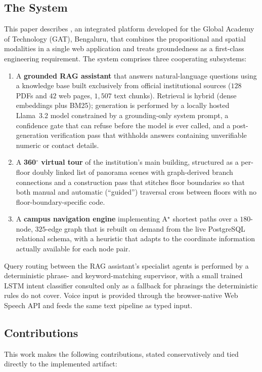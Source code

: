 \subsection{The \system{} System}
This paper describes \system{}, an integrated platform developed for the
Global Academy of Technology (GAT), Bengaluru, that combines the
propositional and spatial modalities in a single web application and treats
groundedness as a first-class engineering requirement. The system comprises
three cooperating subsystems:

\begin{enumerate}
\item A \textbf{grounded RAG assistant} that answers natural-language
questions using a knowledge base built exclusively from official
institutional sources ($128$ PDFs and $42$ web pages, $1{,}507$ text
chunks). Retrieval is hybrid (dense embeddings plus BM25); generation is
performed by a locally hosted Llama~3.2 model constrained by a
grounding-only system prompt, a confidence gate that can refuse before the
model is ever called, and a post-generation verification pass that
withholds answers containing unverifiable numeric or contact details.
\item A \textbf{360$^{\circ}$ virtual tour} of the institution's main
building, structured as a per-floor doubly linked list of panorama scenes
with graph-derived branch connections and a construction pass that stitches
floor boundaries so that both manual and automatic (``guided'') traversal
cross between floors with no floor-boundary-specific code.
\item A \textbf{campus navigation engine} implementing A$^{\star}$ shortest
paths over a $180$-node, $325$-edge graph that is rebuilt on demand from
the live PostgreSQL relational schema, with a heuristic that adapts to the
coordinate information actually available for each node pair.
\end{enumerate}

Query routing between the RAG assistant's specialist agents is performed by
a deterministic phrase- and keyword-matching supervisor, with a small
trained LSTM intent classifier consulted only as a fallback for phrasings
the deterministic rules do not cover. Voice input is provided through the
browser-native Web Speech API and feeds the same text pipeline as typed
input.

\subsection{Contributions}
This work makes the following contributions, stated conservatively and
tied directly to the implemented artifact:

